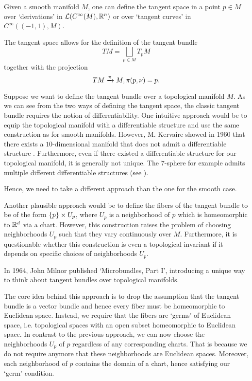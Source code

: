 \begin{myparagraph}
    Given a smooth manifold $M$,
    one can define the tangent space
    in a point $p \in M$ over `derivations' in $\mathcal{L}(C^\infty(M), \mathbb{R}^n)$
    or over `tangent curves' in $C^\infty((-1, 1), M)$.

    The tangent space allows for the definition of the tangent bundle
    \[ TM = \bigsqcup_{p \in M} T_p M\]
    together with the projection
    \[ TM \xrightarrow{\pi} M, \pi(p, \nu) = p. \]

    Suppose we want to define the tangent bundle over a topological manifold $M$.
    As we can see from the two ways of defining the tangent space,
    the classic tangent bundle requires the notion of differentiability.
    One intuitive approach would be to equip the topological manifold
    with a differentiable structure and use the same construction as for smooth manifolds.
    However, M. Kervaire showed in 1960 that there exists a $10$-dimensional manifold
    that does not admit a differentiable structure \cite{kervaire}.
    Furthermore, even if there existed a differentiable structure for our topological manifold,
    it is generally not unique. The $7$-sphere for example admits
    multiple different differentiable structures (see \cite{milnor7sphere}).

    Hence,
    we need to take a different approach than the one for the smooth case.
    
    Another plausible approach would be to define the fibers of the tangent bundle
    to be of the form $\{p\} \times U_p$,
    where $U_p$ is a neighborhood of $p$ which is
    homeomorphic to $\mathbb{R}^d$ via a chart.
    However, this construction raises the problem
    of choosing neighborhoods $U_p$
    such that they vary continuously over $M$.
    Furthermore,
    it is questionable whether this construction is even a topological
    invariant if it depends on specific choices of neighborhoods $U_p$.

    In 1964, John Milnor published `Microbundles, Part I',
    introducing a unique way to think
    about tangent bundles over topological manifolds.

    The core idea behind this approach is
    to drop the assumption
    that the tangent bundle is a vector bundle and hence
    every fiber must be homeomorphic to Euclidean space.
    Instead, we require that the fibers are `germs' of Euclidean space,
    i.e. topological spaces with an open subset homeomorphic to Euclidean space.
    In contrast to the previous approach,
    we can now choose the neighborhoods $U_p$ of $p$ regardless of any corresponding charts.
    That is because we do not require anymore that these neighborhoods are Euclidean spaces.
    Moreover, each neighborhood of $p$ contains
    the domain of a chart, hence satisfying our `germ' condition.


\end{myparagraph}
